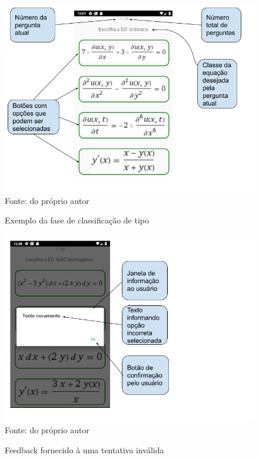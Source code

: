 \begin{figure}[H]
\centering
\caption{Exemplo da fase de classificação de tipo}
\includegraphics[scale=0.72]{figuras/ex_ed_ordinaria.png}
\small{Fonte: do próprio autor}
\end{figure}

\begin{figure}[H]
\centering
\caption{Feedback fornecido à uma tentativa inválida}
\includegraphics[scale=0.72]{figuras/tente_novamente.png}
\small{Fonte: do próprio autor}
\end{figure}

